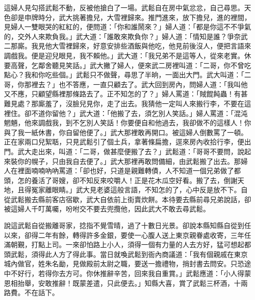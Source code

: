 這婦人見勾搭武鬆不動，反被他搶白了一場。武鬆自在房中氣忿忿，自己尋思。天色卻是申牌時分，武大挑著擔兒，大雪裡歸來。推門進來，放下擔兒，進的裡間，見婦人一雙眼哭的紅紅的，便問道：「你和誰鬧來？」婦人道：「都是你這不不爭氣的，交外人來欺負我。」武大道：「誰敢來欺負你？」婦人道：「情知是誰？爭奈武二那廝。我見他大雪裡歸來，好意安排些酒飯與他吃，他見前後沒人，便把言語來調戲我。便是迎兒眼見，我不賴他。」武大道：「我兄弟不是這等人，從來老實。休要高聲，乞鄰舍聽見笑話。」武大撇了婦人，便來武二房裡叫道：「二哥，你不曾吃點心？我和你吃些個。」武鬆只不做聲，尋思了半晌，一面出大門。武大叫道：「二哥，你那裡去？」也不答應，一直只顧去了。武大回到房內，問婦人道：「我叫他又不應，只顧望縣裡那條路去了。正不知怎的了？」婦人罵道：「賊餛飩蟲！有甚難見處？那廝羞了，沒臉兒見你，走了出去。我猜他一定叫人來搬行李，不要在這裡住。卻不道你留他？」武大道：「他搬了去，須乞別人笑話。」婦人罵道：「混沌魍魎，他來調戲我，到不乞別人笑話！你要便自和他過去，我卻做不的這樣人！你與了我一紙休書，你自留他便了。」武大那裡敢再開口。被這婦人倒數罵了一頓。正在家兩口兒絮聒，只見武鬆引了個土兵，拿著條扁擔，逕來房內收拾行李，便出門。武大走出來，叫道：「二哥，做甚麼便搬了去？」武鬆道：「哥哥不要問，說起來裝你的幌子，只由我自去便了。」武大那裡再敢問備細，由武鬆搬了出去。那婦人在裡面喃喃吶吶罵道：「卻也好，只道是親難轉債，人不知道一個兄弟做了都頭，怎的養活了哥嫂，卻不知反來咬嚼人！正是花木瓜空好看。搬了去，倒謝天地，且得冤家離眼睛。」武大見老婆這般言語，不知怎的了，心中反是放不下。自從武鬆搬去縣前客店宿歇，武大自依前上街賣炊餅。本待要去縣前尋兄弟說話，卻被這婦人千叮萬囑，吩咐交不要去兜攬他，因此武大不敢去尋武鬆。

說這武鬆自從搬離哥家，捻指不覺雪晴，過了十數日光景。卻說本縣知縣自從到任以來，卻得二年有餘，轉得許多金銀，要使一心腹人送上東京親眷處收寄，三年任滿朝覲，打點上司。一來卻怕路上小人，須得一個有力量的人去方好，猛可想起都頭武鬆，須得此人方了得此事。當日就喚武鬆到衙內商議道：「我有個親戚在東京城內做官，姓朱名勔，見做殿前太尉之職，要送一擔禮物，捎封書去問安。只恐途中不好行，若得你去方可。你休推辭辛苦，回來我自重賞。」武鬆應道：「小人得蒙恩相抬舉，安敢推辭！既蒙差遣，只此便去。」知縣大喜，賞了武鬆三杯酒，十兩路費。不在話下。

